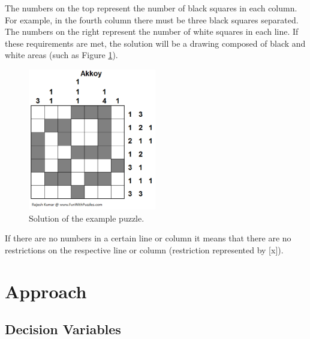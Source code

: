 \documentclass[runningheads,a4paper]{llncs}
\begin{document}
The numbers on the top represent the number of black squares in each column. For example, in the fourth column there must be three black squares separated. The numbers on the right represent the number of white squares in each line. If these requirements are met, the solution will be a drawing composed of black and white areas (such as Figure \ref{solution}). 

\begin{figure}[h!]
\centering
\includegraphics[height=6.2cm]{solucaoExemplo.png}
\caption{Solution of the example puzzle.}
\label{solution}
\end{figure}

If there are no numbers in a certain line or column it means that there are no restrictions on the respective line or column (restriction represented by [x]).

\section {Approach}

\subsection{Decision Variables}
\end{document}
